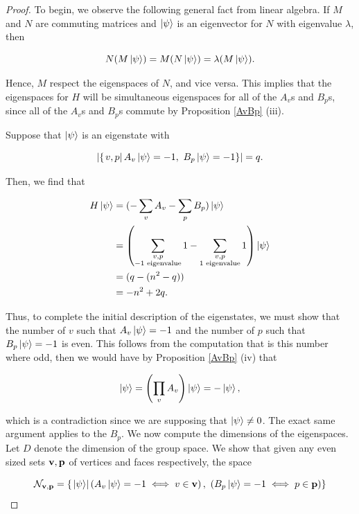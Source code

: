\documentclass{article}
\theoremstyle{definition}
\numberwithin{figure}{section}
\begin{document}
\begin{proof} To begin, we observe the following general fact from linear algebra. If $M$ and $N$ are commuting matrices and $\left|\psi\right>$ is an eigenvector for $N$ with eigenvalue $\lambda$, then

$$N(M\left|\psi\right>)=M(N\left|\psi\right>)=\lambda (M\left|\psi\right>).$$

Hence, $M$ respect the eigenspaces of $N$, and vice versa. This implies that the eigenspaces for $H$ will be simultaneous eigenspaces for all of the $A_v$s and $B_p$s, since all of the $A_v$s and $B_p$s commute by Proposition \ref{AvBp} (iii).

Suppose that $\left|\psi\right>$ is an eigenstate with

$$\left|\left\{\left. v,p\right| A_v\left|\psi\right> =-1,\,\, B_p\left|\psi\right>=-1\right\}\right|=q.$$

Then, we find that

\begin{align*}
H\left|\psi\right>&=(-\sum_{v}A_v-\sum_{p}B_p)\left|\psi\right>\\
&=\left(\sum_{\substack{v,p \\ -1\text{ eigenvalue}}}1-\sum_{\substack{v,p \\ 1\text{ eigenvalue}}}1\right)\left|\psi\right>\\
&=(q-(n^2-q))\\
&=-n^2+2q.
\end{align*}

Thus, to complete the initial description of the eigenstates, we must show that the number of $v$ such that $A_v\left|\psi\right>=-1$ and the number of $p$ such that $B_p\left|\psi\right>=-1$ is even. This follows from the computation that is this number where odd, then we would have by Proposition \ref{AvBp} (iv) that

$$\left|\psi\right> = \left(\prod_{v}A_v\right) \left|\psi\right> = -\left|\psi\right>,$$

which is a contradiction since we are supposing that $\left|\psi\right>\neq 0$. The exact same argument applies to the $B_p$. We now compute the dimensions of the eigenspaces. Let $D$ denote the dimension of the group space. We show that given any even sized sets $\bold{v}, \bold{p}$ of vertices and faces respectively, the space

$$\mathcal{N}_{\bold{v},\bold{p}}=\{\left.\left|\psi\right>\right| \left(A_v\left|\psi\right>=-1\iff v\in \bold{v}\right),\,\, \left(B_p\left|\psi\right>=-1\iff p\in\bold{p}\right) \}$$


\end{proof}
\end{document}
